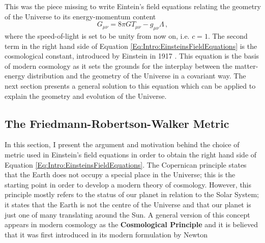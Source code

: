 \qquad This was the piece missing to write Eintein's field equations relating the geometry of the Universe to its energy-momentum content
\begin{equation}
G_{\mu\nu} = 8\pi GT_{\mu\nu} - g_{\mu\nu}\Lambda\, ,
\label{Eq:Intro:EinsteinsFieldEquations}
\end{equation}
where the speed-of-light is set to be unity from now on, i.e. $c=1$. The second term in the right hand side of Equation \eqref{Eq:Intro:EinsteinsFieldEquations} is the cosmological constant, introduced by Einstein in 1917 \citep{1917Einstein,2018LambdaCentury}. This equation is the basis of modern cosmology as it sets the grounds for the interplay between the matter-energy distribution and the geometry of the Universe in a covariant way. The next section presents a general solution to this equation which can be applied to explain the geometry and evolution of the Universe.

\subsection{The Friedmann-Robertson-Walker Metric}
In this section, I present the argument and motivation behind the choice of metric used in Einstein's field equations in order to obtain the right hand side of Equation \eqref{Eq:Intro:EinsteinsFieldEquations}. 
The Copernican principle states that the Earth does not occupy a special place in the Universe; this is the starting point in order to develop a modern theory of cosmology. However, this principle mostly refers to the status of our planet in relation to the Solar System; it states that the Earth is not the centre of the Universe and that our planet is just one of many translating around the Sun. A general version of this concept appears in modern cosmology as the \textbf{Cosmological Principle} and it is believed that it was first introduced in its modern formulation by Newton \citep{newton1687, Gleiser}

